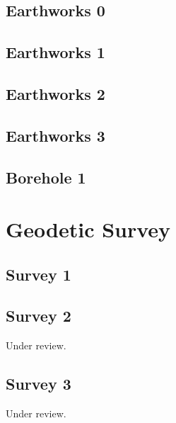\documentclass{scrartcl}
\begin{document}
\subsection{Earthworks 0}
\label{sec:earth_0}
\clearpage

\subsection{Earthworks 1}
\label{sec:earth_1}
\clearpage

\subsection{Earthworks 2}
\label{sec:earth_2}
\clearpage

\subsection{Earthworks 3}
\label{sec:earth_3}
\clearpage

\subsection{Borehole 1}
\label{sec:borehole_1}
\clearpage

\section{Geodetic Survey}
\label{sec:geodetic_survey}

\subsection{Survey 1}
\label{sec:survey_1}
\clearpage

\subsection{Survey 2} %
\label{sec:survey_2}
Under review.%
\clearpage

\subsection{Survey 3} %
\label{sec:survey_3}
Under review.%
\clearpage
\end{document}
